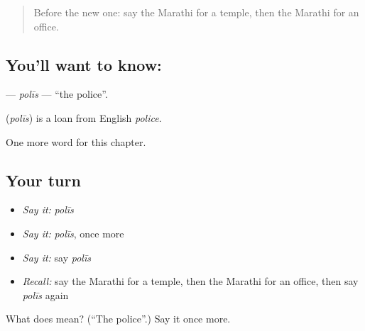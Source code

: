 \label{lesson:MR-C114-polis}



\begin{quote}
Before the new one: say the Marathi for a temple, then the Marathi for an office.
\end{quote}

\subsection*{You'll want to know: }
\textbf{} — \emph{polīs} — \textquotedblleft{}the police\textquotedblright{}.

\begin{cousinweb}
\textbf{} (\emph{polīs}) is a loan from English \emph{police}.
\end{cousinweb}

\begin{grammarlens}[title={What you've built}]
One more word for this chapter.
\end{grammarlens}

\subsection*{Your turn}
\begin{itemize}
\raggedright
  \item \emph{Say it:} \emph{polīs}
  \item \emph{Say it:} \emph{polīs}, once more
  \item \emph{Say it:} say \emph{polīs}
  \item \emph{Recall:} say the Marathi for a temple, then the Marathi for an office, then say \emph{polīs} again
\end{itemize}

\begin{tcolorbox}[breakable,colback=teal!4,colframe=teal!35!black,title={Before you move on}]
What does  mean? (\textquotedblleft{}The police\textquotedblright{}.) Say it once more.
\end{tcolorbox}
